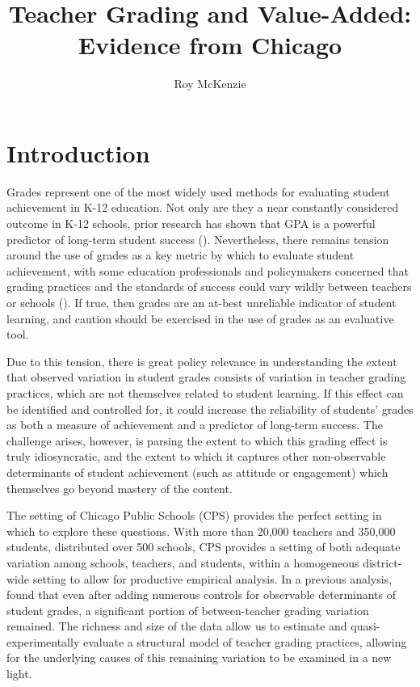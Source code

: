 \documentclass{article}
\title{Teacher Grading and Value-Added:
\\Evidence from Chicago}
\author{Roy McKenzie}
\begin{document}



\doublespacing
\section{Introduction}

Grades represent one of the most widely used methods for evaluating student achievement in K-12 education. Not only are they a near constantly considered outcome in K-12 schools, prior research has shown that GPA is a powerful predictor of long-term student success (\citealt{allensworthHighSchoolGPAs2020, eastonPredictivePowerNinthGrade2017}). Nevertheless, there remains tension around the use of grades as a key metric by which to evaluate student achievement, with some education professionals and policymakers concerned that grading practices and the standards of success could vary wildly between teachers or schools (\citealt{gershensonGradeInflationHigh2018}). If true, then grades are an at-best unreliable indicator of student learning, and caution should be exercised in the use of grades as an evaluative tool. 

Due to this tension, there is great policy relevance in understanding the extent that observed variation in student grades consists of variation in teacher grading practices, which are not themselves related to student learning. If this effect can be identified and controlled for, it could increase the reliability of students' grades as both a measure of achievement and a predictor of long-term success. The challenge arises, however, is parsing the extent to which this grading effect is truly idiosyncratic, and the extent to which it captures other non-observable determinants of student achievement (such as attitude or engagement) which themselves go beyond mastery of the content. 

The setting of Chicago Public Schools (CPS) provides the perfect setting in which to explore these questions. With more than 20,000 teachers and 350,000 students, distributed over 500 schools, CPS provides a setting of both adequate variation among schools, teachers, and students, within a homogeneous district-wide setting to allow for productive empirical analysis. In a previous analysis, \cite{allensworthWhyStudentsGet2018} found that even after adding numerous controls for observable determinants of student grades, a significant portion of between-teacher grading variation remained. The richness and size of the data allow us to estimate and quasi-experimentally evaluate a structural model of teacher grading practices, allowing for the underlying causes of this remaining variation to be examined in a new light. 
\end{document}
